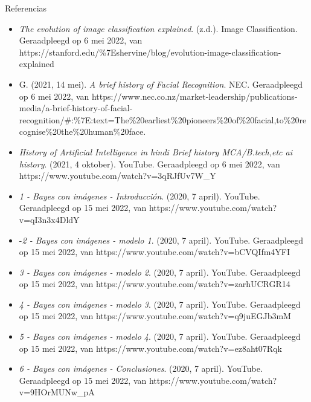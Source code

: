\documentclass[
  spanish,
  ignorenonframetext,
]{beamer}
\providecommand{\tightlist}{%
  \setlength{\itemsep}{0pt}\setlength{\parskip}{0pt}}
\begin{document}
\begin{frame}{Referencias}
\protect\hypertarget{referencias}{}
\begin{itemize}
\tightlist
\item
  \emph{The evolution of image classification explained}. (z.d.). Image
  Classification. Geraadpleegd op 6 mei 2022, van
  https://stanford.edu/\%7Eshervine/blog/evolution-image-classification-explained
\item
  G. (2021, 14 mei). \emph{A brief history of Facial Recognition}. NEC.
  Geraadpleegd op 6 mei 2022, van
  https://www.nec.co.nz/market-leadership/publications-media/a-brief-history-of-facial-recognition/\#:\%7E:text=The\%20earliest\%20pioneers\%20of\%20facial,to\%20recognise\%20the\%20human\%20face.
\item
  \emph{History of Artificial Intelligence in hindi \textbar{} Brief
  history \textbar{} MCA/B.tech,etc \textbar{} ai history}. (2021, 4
  oktober). YouTube. Geraadpleegd op 6 mei 2022, van
  https://www.youtube.com/watch?v=3qRJfUv7W\_Y
\item
  \emph{1 - Bayes con imágenes - Introducción}. (2020, 7 april).
  YouTube. Geraadpleegd op 15 mei 2022, van
  https://www.youtube.com/watch?v=qI3n3x4DldY
\item
  -\emph{2 - Bayes con imágenes - modelo 1}. (2020, 7 april). YouTube.
  Geraadpleegd op 15 mei 2022, van
  https://www.youtube.com/watch?v=bCVQIfm4YFI
\item
  \emph{3 - Bayes con imágenes - modelo 2}. (2020, 7 april). YouTube.
  Geraadpleegd op 15 mei 2022, van
  https://www.youtube.com/watch?v=zarhUCRGR14
\item
  \emph{4 - Bayes con imágenes - modelo 3}. (2020, 7 april). YouTube.
  Geraadpleegd op 15 mei 2022, van
  https://www.youtube.com/watch?v=q9juEGJb3mM
\item
  \emph{5 - Bayes con imágenes - modelo 4}. (2020, 7 april). YouTube.
  Geraadpleegd op 15 mei 2022, van
  https://www.youtube.com/watch?v=ez8aht07Rqk
\item
  \emph{6 - Bayes con imágenes - Conclusiones}. (2020, 7 april).
  YouTube. Geraadpleegd op 15 mei 2022, van
  https://www.youtube.com/watch?v=9HOrMUNw\_pA
\end{itemize}
\end{frame}
\end{document}
